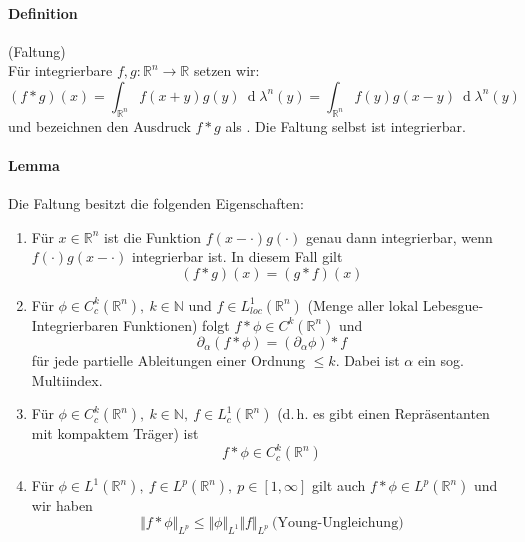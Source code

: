 \documentclass[12pt,a4paper,fleqn]{article}
\def\d{{\operatorname{d}}}
\begin{document}
\paragraph{Definition} (Faltung)\\
Für integrierbare $f, g\colon \mathbb{R}^n \rightarrow \mathbb{R}$ setzen wir:
\begin{displaymath}
(f * g)(x) = \int_{\mathbb{R}^n} f(x + y)g(y)\ \d\lambda^n(y) = \int_{\mathbb{R}^n} f(y)g(x  - y)\ \d\lambda^n(y)
\end{displaymath}
und bezeichnen den Ausdruck $f * g$ als . Die Faltung selbst ist integrierbar.

\paragraph{Lemma} Die Faltung besitzt die folgenden Eigenschaften:
\begin{enumerate}
\item Für $x \in \mathbb{R}^n$ ist die Funktion $f(x  - \cdot)g(\cdot)$ genau dann integrierbar, wenn $f(\cdot)g(x - \cdot)$ integrierbar ist. In diesem Fall gilt 
\begin{displaymath}
(f * g)(x) = (g*f)(x)
\end{displaymath}
\item Für $\phi \in C^k_c(\mathbb{R}^n),\ k \in \mathbb{N}$ und $f \in L^1_{loc}(\mathbb{R}^n)$ (Menge aller lokal Lebesgue-Integrierbaren Funktionen) folgt $f * \phi \in C^k(\mathbb{R}^n)$ und 
\begin{displaymath}
\partial_\alpha (f * \phi) = (\partial_\alpha \phi) * f
\end{displaymath}
für jede partielle Ableitungen einer Ordnung $\leq k$. Dabei ist $\alpha$ ein sog. Multiindex.
\item Für $\phi \in C^k_c (\mathbb{R}^n),\ k \in \mathbb{N},\ f \in L^1_c(\mathbb{R}^n)$ (d.\,h. es gibt einen Repräsentanten mit kompaktem Träger) ist
\begin{displaymath}
f * \phi \in C^k_c(\mathbb{R}^n)
\end{displaymath}
\item Für $\phi \in L^1(\mathbb{R}^n),\ f\in L^p(\mathbb{R}^n),\ p \in [1, \infty]$ gilt auch $f * \phi \in L^p(\mathbb{R}^n)$ und wir haben
\begin{displaymath}
\Vert f * \phi \Vert_{L^p} \leq \Vert \phi \Vert_{L^1} \Vert f \Vert_{L^p}\ \text{(Young-Ungleichung)}
\end{displaymath}
\end{enumerate}
\end{document}

